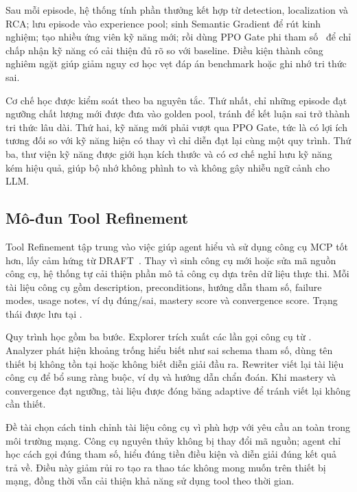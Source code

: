 Sau mỗi episode, hệ thống tính phần thưởng kết hợp từ detection, localization và RCA; lưu episode vào experience pool; sinh Semantic Gradient để rút kinh nghiệm; tạo nhiều ứng viên kỹ năng mới; rồi dùng PPO Gate phi tham số~\citep{ppo2017} để chỉ chấp nhận kỹ năng có cải thiện đủ rõ so với baseline. Điều kiện thành công nghiêm ngặt giúp giảm nguy cơ học vẹt đáp án benchmark hoặc ghi nhớ tri thức sai.

Cơ chế học được kiểm soát theo ba nguyên tắc. Thứ nhất, chỉ những episode đạt ngưỡng chất lượng mới được đưa vào golden pool, tránh để kết luận sai trở thành tri thức lâu dài. Thứ hai, kỹ năng mới phải vượt qua PPO Gate, tức là có lợi ích tương đối so với kỹ năng hiện có thay vì chỉ diễn đạt lại cùng một quy trình. Thứ ba, thư viện kỹ năng được giới hạn kích thước và có cơ chế nghỉ hưu kỹ năng kém hiệu quả, giúp bộ nhớ không phình to và không gây nhiễu ngữ cảnh cho LLM.

\subsection{Mô-đun Tool Refinement}

Tool Refinement tập trung vào việc giúp agent hiểu và sử dụng công cụ MCP tốt hơn, lấy cảm hứng từ DRAFT~\citep{draft2024}. Thay vì sinh công cụ mới hoặc sửa mã nguồn công cụ, hệ thống tự cải thiện phần mô tả công cụ dựa trên dữ liệu thực thi. Mỗi tài liệu công cụ gồm description, preconditions, hướng dẫn tham số, failure modes, usage notes, ví dụ đúng/sai, mastery score và convergence score. Trạng thái được lưu tại .

Quy trình học gồm ba bước. Explorer trích xuất các lần gọi công cụ từ . Analyzer phát hiện khoảng trống hiểu biết như sai schema tham số, dùng tên thiết bị không tồn tại hoặc không biết diễn giải đầu ra. Rewriter viết lại tài liệu công cụ để bổ sung ràng buộc, ví dụ và hướng dẫn chẩn đoán. Khi mastery và convergence đạt ngưỡng, tài liệu được đóng băng adaptive để tránh viết lại không cần thiết.

Đề tài chọn cách tinh chỉnh tài liệu công cụ vì phù hợp với yêu cầu an toàn trong môi trường mạng. Công cụ nguyên thủy không bị thay đổi mã nguồn; agent chỉ học cách gọi đúng tham số, hiểu đúng tiền điều kiện và diễn giải đúng kết quả trả về. Điều này giảm rủi ro tạo ra thao tác không mong muốn trên thiết bị mạng, đồng thời vẫn cải thiện khả năng sử dụng tool theo thời gian.
